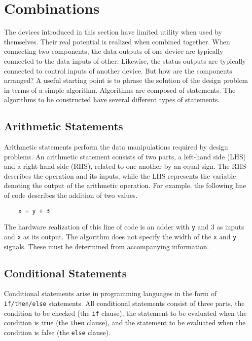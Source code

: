
\section{Combinations}
The devices introduced in this section have limited utility when
used by themselves. Their real potential is realized when combined together. 
When connecting two components, the data 
outputs of one device are typically connected to the data inputs 
of other.  Likewise, the status outputs are typically connected 
to control inputs of another device.  But how are the components arranged? 
A useful starting point is to phrase the solution 
of the design problem in terms of a simple algorithm.  Algorithms 
are composed of statements. The algorithms to be constructed 
have several different types of statements.

\subsection{Arithmetic Statements}
Arithmetic statements perform the data manipulations required by
design problems.  An arithmetic statement consists of two parts,
a left-hand side (LHS) and a right-hand side (RHS), related to one
another by an equal sign.  The RHS describes the operation and its
inputs, while the LHS represents the variable denoting the output 
of the arithmetic operation.  For example, the following line of
code describes the addition of two values.

\begin{verbatim}
    x = y + 3
\end{verbatim}

The hardware realization of this line of code is an adder with \verb+y+ 
and 3 as inputs and \verb+x+ as its output.  The algorithm does not
specify the width of the \verb+x+ and \verb+y+ signals. These must
be determined from accompanying information.


\subsection{Conditional Statements}
Conditional statements arise in programming languages in the
form of \verb+if/then/else+ statements.  All conditional statements consist 
of three parts, the condition to be checked (the \verb+if+ clause), the 
statement to be evaluated when the condition is true (the \verb+then+ clause), 
and the statement to be evaluated when the condition is false (the
\verb+else+ clause).

